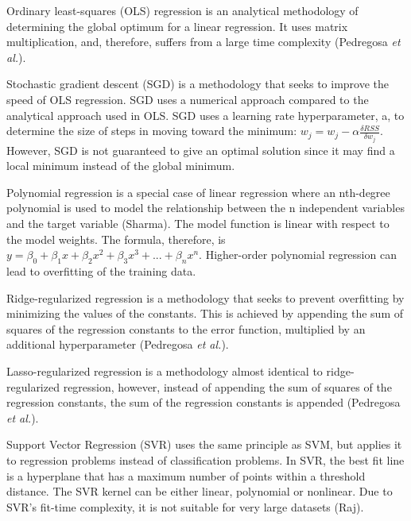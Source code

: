 \documentclass[12pt]{article}
\begin{document}
\par Ordinary least-squares (OLS) regression is an analytical methodology of determining the global optimum for a linear regression. It uses matrix multiplication, and, therefore, suffers from a large time complexity (Pedregosa \emph{et al.}).
\par Stochastic gradient descent (SGD) is a methodology that seeks to improve the speed of OLS regression. SGD uses a numerical approach compared to the analytical approach used in OLS. SGD uses a learning rate hyperparameter, a, to determine the size of steps in moving toward the minimum: \emph{$w_j=w_j-\alpha\frac{\delta{RSS}}{\delta{w_j}}$}. However, SGD is not guaranteed to give an optimal solution since it may find a local minimum instead of the global minimum.
\par Polynomial regression is a special case of linear regression where an nth-degree polynomial is used to model the relationship between the n independent variables and the target variable (Sharma). The model function is linear with respect to the model weights. The formula, therefore, is \emph{$y=\beta_0+\beta_{1}x+\beta_{2}x^2+\beta_{3}x^3+...+\beta_{n}x^n$}. Higher-order polynomial regression can lead to overfitting of the training data.
\par Ridge-regularized regression is a methodology that seeks to prevent overfitting by minimizing the values of the constants. This is achieved by appending the sum of squares of the regression constants to the error function, multiplied by an additional hyperparameter (Pedregosa \emph{et al.}).
\par Lasso-regularized regression is a methodology almost identical to ridge-regularized regression, however, instead of appending the sum of squares of the regression constants, the sum of the regression constants is appended (Pedregosa \emph{et al.}).
\par Support Vector Regression (SVR) uses the same principle as SVM, but applies it to regression problems instead of classification problems. In SVR, the best fit line is a hyperplane that has a maximum number of points within a threshold distance. The SVR kernel can be either linear, polynomial or nonlinear. Due to SVR’s fit-time complexity, it is not suitable for very large datasets (Raj).
\end{document}
